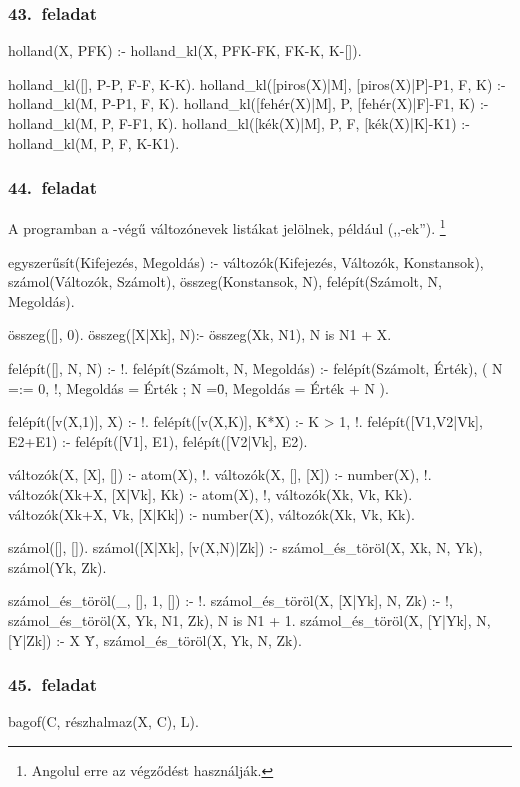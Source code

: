 \subsubsection*{43.~feladat}
\begin{program}
holland(X, PFK) :- holland_kl(X, PFK-FK, FK-K, K-[]).

holland_kl([], P-P, F-F, K-K). 
holland_kl([piros(X)|M], [piros(X)|P]-P1, F, K) :-
    holland_kl(M, P-P1, F, K). 
holland_kl([fehér(X)|M], P, [fehér(X)|F]-F1, K) :-
    holland_kl(M, P, F-F1, K). 
holland_kl([kék(X)|M], P, F, [kék(X)|K]-K1) :-
    holland_kl(M, P, F, K-K1). 
\end{program}
\subsubsection*{44.~feladat}
A programban a -végű változónevek listákat
jelölnek, például  (,,-ek'').%
\footnote{Angolul erre az  végződést
használják.}
\begin{program}
egyszerűsít(Kifejezés, Megoldás) :-
    változók(Kifejezés, Változók, Konstansok),
    számol(Változók, Számolt),
    összeg(Konstansok, N),
    felépít(Számolt, N, Megoldás).

összeg([], 0).
összeg([X|Xk], N):- összeg(Xk, N1), N is N1 + X.

felépít([], N, N) :- !.
felépít(Számolt, N, Megoldás) :-
    felépít(Számolt, Érték),
    ( N =:= 0, !, Megoldás = Érték
    ; N =\= 0, Megoldás = Érték + N
    ).

felépít([v(X,1)], X) :- !.
felépít([v(X,K)], K*X) :- K > 1, !.
felépít([V1,V2|Vk], E2+E1) :-
    felépít([V1], E1),
    felépít([V2|Vk], E2).

változók(X, [X], []) :- atom(X), !.
változók(X, [], [X]) :- number(X), !.
változók(Xk+X, [X|Vk], Kk) :-
    atom(X), !, változók(Xk, Vk, Kk).
változók(Xk+X, Vk, [X|Kk]) :-
    number(X), változók(Xk, Vk, Kk).

számol([], []).
számol([X|Xk], [v(X,N)|Zk]) :-
    számol_és_töröl(X, Xk, N, Yk),
    számol(Yk, Zk).

számol_és_töröl(_, [], 1, []) :- !.
számol_és_töröl(X, [X|Yk], N, Zk) :-
    !, számol_és_töröl(X, Yk, N1, Zk),
    N is N1 + 1.
számol_és_töröl(X, [Y|Yk], N, [Y|Zk]) :-
    X \= Y, számol_és_töröl(X, Yk, N, Zk).
\end{program}
\subsubsection*{45.~feladat}
\begin{program}
bagof(C, részhalmaz(X, C), L).
\end{program}

